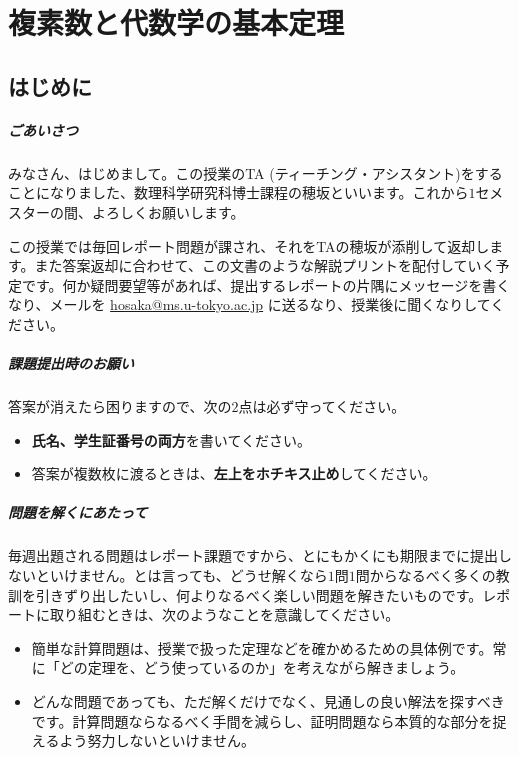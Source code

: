 \chapter{複素数と代数学の基本定理}


\section{はじめに}

\paragraph{ごあいさつ}

みなさん、はじめまして。この授業のTA (ティーチング・アシスタント)をすることになりました、数理科学研究科博士課程の穂坂といいます。これから$1$セメスターの間、よろしくお願いします。

この授業では毎回レポート問題が課され、それをTAの穂坂が添削して返却します。また答案返却に合わせて、この文書のような解説プリントを配付していく予定です。何か疑問要望等があれば、提出するレポートの片隅にメッセージを書くなり、メールを \url{hosaka@ms.u-tokyo.ac.jp} に送るなり、授業後に聞くなりしてください。

\paragraph{課題提出時のお願い}
答案が消えたら困りますので、次の$2$点は必ず守ってください。\vspace{-0.5zw}
\begin{itemize}
\item \textbf{氏名、学生証番号の両方}を書いてください。
\item 答案が複数枚に渡るときは、\textbf{左上をホチキス止め}してください。
\end{itemize}

\vspace{-1zw}

\paragraph{問題を解くにあたって}

毎週出題される問題はレポート課題ですから、とにもかくにも期限までに提出しないといけません。とは言っても、どうせ解くなら$1$問$1$問からなるべく多くの教訓を引きずり出したいし、何よりなるべく楽しい問題を解きたいものです。レポートに取り組むときは、次のようなことを意識してください。\vspace{-0.5zw}
\begin{itemize}
\item 簡単な計算問題は、授業で扱った定理などを確かめるための具体例です。常に「どの定理を、どう使っているのか」を考えながら解きましょう。
\item どんな問題であっても、ただ解くだけでなく、見通しの良い解法を探すべきです。計算問題ならなるべく手間を減らし、証明問題なら本質的な部分を捉えるよう努力しないといけません。
\end{itemize}\vspace{-1zw}

